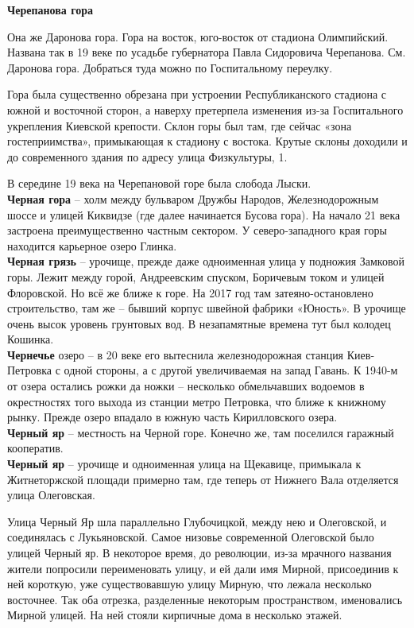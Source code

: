 \textbf{Черепанова гора}

Она же Даронова гора. Гора на восток, юго-восток от стадиона Олимпийский. Названа так в 19 веке по усадьбе губернатора Павла Сидоровича Черепанова. См. Даронова гора. Добраться туда можно по Госпитальному переулку.

Гора была существенно обрезана при устроении Республиканского стадиона с южной и восточной сторон, а наверху претерпела изменения из-за Госпитального укрепления Киевской крепости. Склон горы был там, где сейчас «зона гостеприимства», примыкающая к стадиону с востока. Крутые склоны доходили и до современного здания по адресу улица Физкультуры, 1.

В середине 19 века на Черепановой горе была слобода Лыски.\\

\textbf{Черная гора} – холм между бульваром Дружбы Народов, Железнодорожным шоссе и улицей Киквидзе (где далее начинается Бусова гора). На начало 21 века застроена преимущественно частным сектором. У северо-западного края горы находится карьерное озеро Глинка.\\

\textbf{Черная грязь} – урочище, прежде даже одноименная улица у подножия Замковой горы. Лежит между горой, Андреевским спуском, Боричевым током и улицей Флоровской. Но всё же ближе к горе. На 2017 год там затеяно-остановлено строительство, там же – бывший корпус швейной фабрики «Юность». В урочище очень высок уровень грунтовых вод. В незапамятные времена тут был колодец Кошинка.\\

\textbf{Чернечье} озеро – в 20 веке его вытеснила железнодорожная станция Киев-Петровка с одной стороны, а с другой увеличиваемая на запад Гавань. К 1940-м от озера остались рожки да ножки – несколько обмельчавших водоемов в окрестностях того выхода из станции метро Петровка, что ближе к книжному рынку. Прежде озеро впадало в южную часть Кирилловского озера.\\ 

\textbf{Черный яр} – местность на Черной горе. Конечно же, там поселился гаражный кооператив.\\

\textbf{Черный яр} – урочище и одноименная улица на Щекавице, примыкала к Житнеторжской площади примерно там, где теперь от Нижнего Вала отделяется улица Олеговская. 

Улица Черный Яр шла параллельно Глубочицкой, между нею и Олеговской, и соединялась с Лукьяновской. Самое низовье современной Олеговской было улицей Черный яр. В некоторое время, до революции, из-за мрачного названия жители попросили переименовать улицу, и ей дали имя Мирной, присоединив к ней короткую, уже существовавшую улицу Мирную, что лежала несколько восточнее. Так оба отрезка, разделенные некоторым пространством, именовались Мирной улицей. На ней стояли кирпичные дома в несколько этажей.

